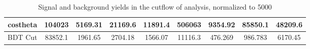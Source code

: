 \begin{table}[!htbp]
\begin{tabular}{c|c|c|c|c|c|c|c|c}
costheta                &104023          &5169.31         &21169.6          &11891.4         &506063           &9354.92           &85850.1          &48209.6           \\ \hline 
BDT Cut                 &83852.1         &1961.65         &2704.18          &1566.07         &11116.3          &476.269           &986.783          &6170.45           \\ \hline         
\end{tabular}
\caption{Signal and background yields in the cutflow of \nnh analysis, normalized to 5000 \ifb}
\end{table}




